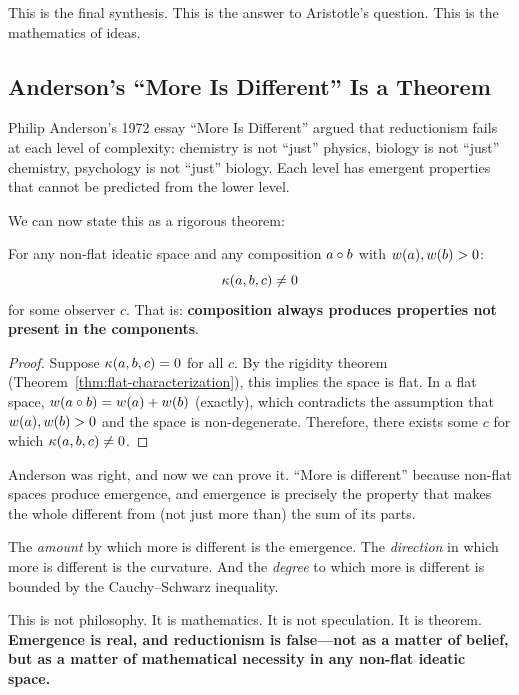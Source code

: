 This is the final synthesis. This is the answer to Aristotle's question. This
is the mathematics of ideas.

\subsection{Anderson's ``More Is Different'' Is a Theorem}

Philip Anderson's 1972 essay ``More Is Different'' argued that reductionism
fails at each level of complexity: chemistry is not ``just'' physics, biology
is not ``just'' chemistry, psychology is not ``just'' biology. Each level has
emergent properties that cannot be predicted from the lower level.

We can now state this as a rigorous theorem:

\begin{theorem}
\label{thm:anderson}
For any non-flat ideatic space and any composition $a \circ b$ with
$w(a), w(b) > 0$:
\[
  \kappa(a, b, c) \neq 0
\]
for some observer $c$. That is: \textbf{composition always produces properties
not present in the components}.
\end{theorem}

\begin{proof}
Suppose $\kappa(a, b, c) = 0$ for all $c$. By the rigidity theorem
(Theorem~\ref{thm:flat-characterization}), this implies the space is flat.
In a flat space, $w(a \circ b) = w(a) + w(b)$ (exactly),
which contradicts the assumption that $w(a), w(b) > 0$ and the
space is non-degenerate. Therefore, there exists some $c$ for which
$\kappa(a, b, c) \neq 0$.
\end{proof}

\begin{interpretation}
Anderson was right, and now we can prove it. ``More is different'' because
non-flat spaces produce emergence, and emergence is precisely the property
that makes the whole different from (not just more than) the sum of its parts.

The \emph{amount} by which more is different is the emergence. The
\emph{direction} in which more is different is the curvature. And the
\emph{degree} to which more is different is bounded by the Cauchy--Schwarz
inequality.

This is not philosophy. It is mathematics. It is not speculation. It is
theorem. \textbf{Emergence is real, and reductionism is false---not as a
matter of belief, but as a matter of mathematical necessity in any non-flat
ideatic space.}
\end{interpretation}

